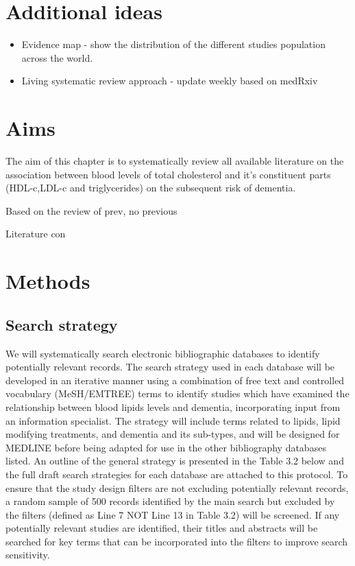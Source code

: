 \documentclass[a4paper, twoside]{templates/ociamthesis}
\providecommand{\tightlist}{%
  \setlength{\itemsep}{0pt}\setlength{\parskip}{0pt}}
\begin{document}
\hypertarget{additional-ideas-1}{%
\section{Additional ideas}\label{additional-ideas-1}}

\begin{itemize}
\tightlist
\item
  Evidence map - show the distribution of the different studies population across the world.
\item
  Living systematic review approach - update weekly based on medRxiv
\end{itemize}

\hypertarget{aims}{%
\section{Aims}\label{aims}}

The aim of this chapter is to systematically review all available literature on the association between blood levels of total cholesterol and it's constituent parts (HDL-c,LDL-c and triglycerides) on the subsequent risk of dementia.

Based on the review of prev, no previous

Literature con

\hypertarget{methods}{%
\section{Methods}\label{methods}}

\hypertarget{search-strategy}{%
\subsection{Search strategy}\label{search-strategy}}

We will systematically search electronic bibliographic databases to identify potentially relevant records. The search strategy used in each database will be developed in an iterative manner using a combination of free text and controlled vocabulary (MeSH/EMTREE) terms to identify studies which have examined the relationship between blood lipids levels and dementia, incorporating input from an information specialist. The strategy will include terms related to lipids, lipid modifying treatments, and dementia and its sub-types, and will be designed for MEDLINE before being adapted for use in the other bibliography databases listed. An outline of the general strategy is presented in the Table 3.2 below and the full draft search strategies for each database are attached to this protocol. To ensure that the study design filters are not excluding potentially relevant records, a random sample of 500 records identified by the main search but excluded by the filters (defined as Line 7 NOT Line 13 in Table 3.2) will be screened. If any potentially relevant studies are identified, their titles and abstracts will be searched for key terms that can be incorporated into the filters to improve search sensitivity.
\end{document}
